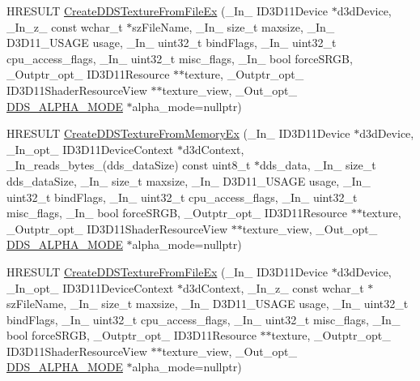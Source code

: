 \begin{DoxyCompactItemize}
H\+R\+E\+S\+U\+LT \hyperlink{namespacemage_a9045c198b22d96e6225961f391cb4e04}{Create\+D\+D\+S\+Texture\+From\+File\+Ex} (\+\_\+\+In\+\_\+ I\+D3\+D11\+Device $\ast$d3d\+Device, \+\_\+\+In\+\_\+z\+\_\+ const wchar\+\_\+t $\ast$sz\+File\+Name, \+\_\+\+In\+\_\+ size\+\_\+t maxsize, \+\_\+\+In\+\_\+ D3\+D11\+\_\+\+U\+S\+A\+GE usage, \+\_\+\+In\+\_\+ uint32\+\_\+t bind\+Flags, \+\_\+\+In\+\_\+ uint32\+\_\+t cpu\+\_\+access\+\_\+flags, \+\_\+\+In\+\_\+ uint32\+\_\+t misc\+\_\+flags, \+\_\+\+In\+\_\+ bool force\+S\+R\+GB, \+\_\+\+Outptr\+\_\+opt\+\_\+ I\+D3\+D11\+Resource $\ast$$\ast$texture, \+\_\+\+Outptr\+\_\+opt\+\_\+ I\+D3\+D11\+Shader\+Resource\+View $\ast$$\ast$texture\+\_\+view, \+\_\+\+Out\+\_\+opt\+\_\+ \hyperlink{namespacemage_a0c586a2bad862f4858900ca121ca80c2}{D\+D\+S\+\_\+\+A\+L\+P\+H\+A\+\_\+\+M\+O\+DE} $\ast$alpha\+\_\+mode=nullptr)
\item 
H\+R\+E\+S\+U\+LT \hyperlink{namespacemage_a55e3dfd62e363db1e284246ab1be5f48}{Create\+D\+D\+S\+Texture\+From\+Memory\+Ex} (\+\_\+\+In\+\_\+ I\+D3\+D11\+Device $\ast$d3d\+Device, \+\_\+\+In\+\_\+opt\+\_\+ I\+D3\+D11\+Device\+Context $\ast$d3d\+Context, \+\_\+\+In\+\_\+reads\+\_\+bytes\+\_\+(dds\+\_\+data\+Size) const uint8\+\_\+t $\ast$dds\+\_\+data, \+\_\+\+In\+\_\+ size\+\_\+t dds\+\_\+data\+Size, \+\_\+\+In\+\_\+ size\+\_\+t maxsize, \+\_\+\+In\+\_\+ D3\+D11\+\_\+\+U\+S\+A\+GE usage, \+\_\+\+In\+\_\+ uint32\+\_\+t bind\+Flags, \+\_\+\+In\+\_\+ uint32\+\_\+t cpu\+\_\+access\+\_\+flags, \+\_\+\+In\+\_\+ uint32\+\_\+t misc\+\_\+flags, \+\_\+\+In\+\_\+ bool force\+S\+R\+GB, \+\_\+\+Outptr\+\_\+opt\+\_\+ I\+D3\+D11\+Resource $\ast$$\ast$texture, \+\_\+\+Outptr\+\_\+opt\+\_\+ I\+D3\+D11\+Shader\+Resource\+View $\ast$$\ast$texture\+\_\+view, \+\_\+\+Out\+\_\+opt\+\_\+ \hyperlink{namespacemage_a0c586a2bad862f4858900ca121ca80c2}{D\+D\+S\+\_\+\+A\+L\+P\+H\+A\+\_\+\+M\+O\+DE} $\ast$alpha\+\_\+mode=nullptr)
\item 
H\+R\+E\+S\+U\+LT \hyperlink{namespacemage_a631c86abbb86a2c2cdfd04bd8a08f2b7}{Create\+D\+D\+S\+Texture\+From\+File\+Ex} (\+\_\+\+In\+\_\+ I\+D3\+D11\+Device $\ast$d3d\+Device, \+\_\+\+In\+\_\+opt\+\_\+ I\+D3\+D11\+Device\+Context $\ast$d3d\+Context, \+\_\+\+In\+\_\+z\+\_\+ const wchar\+\_\+t $\ast$sz\+File\+Name, \+\_\+\+In\+\_\+ size\+\_\+t maxsize, \+\_\+\+In\+\_\+ D3\+D11\+\_\+\+U\+S\+A\+GE usage, \+\_\+\+In\+\_\+ uint32\+\_\+t bind\+Flags, \+\_\+\+In\+\_\+ uint32\+\_\+t cpu\+\_\+access\+\_\+flags, \+\_\+\+In\+\_\+ uint32\+\_\+t misc\+\_\+flags, \+\_\+\+In\+\_\+ bool force\+S\+R\+GB, \+\_\+\+Outptr\+\_\+opt\+\_\+ I\+D3\+D11\+Resource $\ast$$\ast$texture, \+\_\+\+Outptr\+\_\+opt\+\_\+ I\+D3\+D11\+Shader\+Resource\+View $\ast$$\ast$texture\+\_\+view, \+\_\+\+Out\+\_\+opt\+\_\+ \hyperlink{namespacemage_a0c586a2bad862f4858900ca121ca80c2}{D\+D\+S\+\_\+\+A\+L\+P\+H\+A\+\_\+\+M\+O\+DE} $\ast$alpha\+\_\+mode=nullptr)

\end{DoxyCompactItemize}
